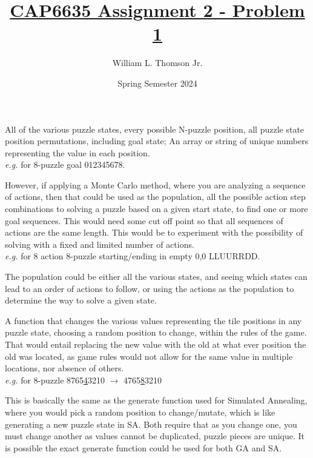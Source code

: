 \documentclass[12pt]{article}
\title{\vspace{-50pt}\textbf{\underline{CAP6635 Assignment 2 - Problem 1}}}
\author{William L. Thomson Jr.}
\date{Spring Semester 2024}
\begin{document}
\maketitle

\begin{description}[itemsep=1em, leftmargin=0cm]
	\item[What does a population represent in this case?] \hfill \break
		All of the various puzzle states, every possible N-puzzle position, all puzzle state
		position permutations, including goal state; An array or string of unique numbers
		representing the value in each position. \\
		\emph{e.g.} for 8-puzzle goal 012345678.

        However, if applying a Monte Carlo method, where you are analyzing a sequence
        of actions, then that could be used as the population, all the possible action step
        combinations to solving a puzzle based on a given start state, to find one or more
        goal sequences. This would need some cut off point so that all sequences of
        actions are the same length. This would be to experiment with the possibility 
        of solving with a fixed and limited number of actions. \\
		\emph{e.g.} for 8 action 8-puzzle starting/ending in empty 0,0 LLUURRDD.

        The population could be either all the various states, and seeing which states
        can lead to an order of actions to follow, or using the actions as the population
        to determine the way to solve a given state.

	\item[What is your mutation function?] \hfill \break
		A function that changes the various values representing the tile positions in any puzzle
		state, choosing a random position to change, within the rules of the game. That would
		entail replacing the new value with the old at what ever position the old was located,
		as game rules would not allow for the same value in multiple locations, nor absence
		of others. \\
		\emph{e.g.} for 8-puzzle 8765\underline{4}3210 $\rightarrow$ 4765\underline{8}3210

        This is basically the same as the generate function used for Simulated Annealing,
        where you would pick a random position to change/mutate, which is like generating
        a new puzzle state in SA. Both require that as you change one, you must change
        another as values cannot be duplicated, puzzle pieces are unique. It is possible
        the exact generate function could be used for both GA and SA.




\end{description}
\end{document}
